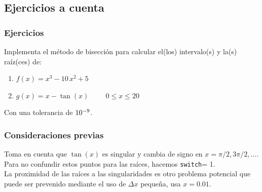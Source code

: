 \documentclass[12pt]{beamer}
\begin{document}

\subsection{Ejercicios a cuenta}

\begin{frame}
\frametitle{Ejercicios}
Implementa el método de bisección para calcular el(los) intervalo(s) y la(s) raíz(ces) de:
\pause
{}
\begin{enumerate}[<+->]
\item $f (x) = x^{3} - 10 \, x^{2} + 5$
\item $g (x) = x - \tan(x) \hspace{1cm} 0 \leq x \leq 20$
\end{enumerate}
Con una tolerancia de $\num{d-9}$.
\end{frame}
\begin{frame}
\frametitle{Consideraciones previas}
Toma en cuenta que $\tan(x)$ es singular y cambia de signo en $x = \pi/2, 3\pi/2,\ldots$. Para no confundir estos puntos para las raíces, hacemos \texttt{switch}= 1.
\\
\medskip
\pause
La proximidad de las raíces a las singularidades es otro problema potencial que puede ser prevenido mediante el uso de $\Delta x$ pequeña, usa $x = 0.01$.
\end{frame}
\end{document}
